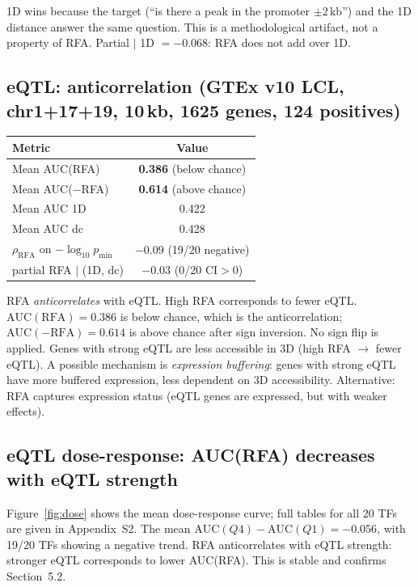 \documentclass[11pt,a4paper]{article}
\begin{document}
1D wins because the target (``is there a peak in the promoter $\pm2$\,kb'') and the 1D distance answer the same question. This is a methodological artifact, not a property of RFA. Partial $\mid$ 1D $= -0.068$: RFA does not add over 1D.

\subsection{eQTL: anticorrelation (GTEx v10 LCL, chr1+17+19, 10\,kb, 1625 genes, 124 positives)}
\begin{table}[h]
\centering
\begin{tabular}{lc}
\toprule
Metric & Value \\
\midrule
Mean AUC(RFA) & \textbf{0.386} (below chance) \\
Mean AUC($-$RFA) & \textbf{0.614} (above chance) \\
Mean AUC 1D & 0.422 \\
Mean AUC dc & 0.428 \\
$\rho_{\mathrm{RFA}}$ on $-\log_{10} p_{\min}$ & $\mathbf{-0.09}$ (19/20 negative) \\
partial RFA $\mid$ (1D, dc) & $-0.03$ (0/20 CI$>0$) \\
\bottomrule
\end{tabular}
\end{table}

RFA \emph{anticorrelates} with eQTL. High RFA corresponds to fewer eQTL. $\mathrm{AUC}(\mathrm{RFA})=0.386$ is below chance, which is the anticorrelation; $\mathrm{AUC}(-\mathrm{RFA})=0.614$ is above chance after sign inversion. No sign flip is applied. Genes with strong eQTL are less accessible in 3D (high RFA $\rightarrow$ fewer eQTL). A possible mechanism is \emph{expression buffering}: genes with strong eQTL have more buffered expression, less dependent on 3D accessibility. Alternative: RFA captures expression status (eQTL genes are expressed, but with weaker effects).

\subsection{eQTL dose-response: AUC(RFA) decreases with eQTL strength}
Figure~\ref{fig:dose} shows the mean dose-response curve; full tables for all 20 TFs are given in Appendix~S2. The mean $\mathrm{AUC}(Q4) - \mathrm{AUC}(Q1) = -0.056$, with 19/20 TFs showing a negative trend. RFA anticorrelates with eQTL strength: stronger eQTL corresponds to lower AUC(RFA). This is stable and confirms Section~5.2.
\end{document}
